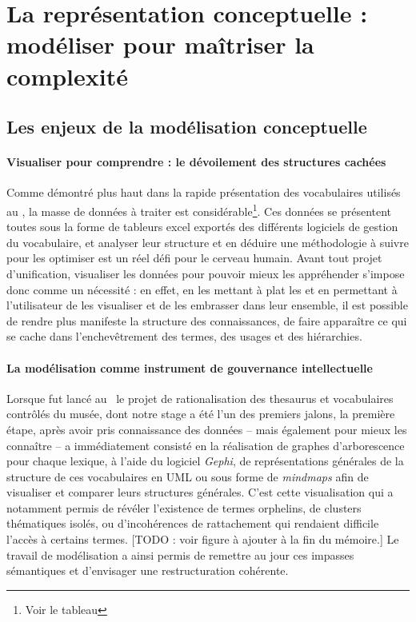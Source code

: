\section[La modélisation]{\label{III-A-1}La représentation conceptuelle : modéliser pour maîtriser la complexité}

\subsection{Les enjeux de la modélisation conceptuelle}

\paragraph*{Visualiser pour comprendre : le dévoilement des structures cachées}
Comme démontré plus haut dans la rapide présentation des vocabulaires utilisés au \mae, la masse de données à traiter est considérable\footnote{Voir le tableau }. Ces données se présentent toutes sous la forme de tableurs excel exportés des différents logiciels de gestion du vocabulaire, et analyser leur structure et en déduire une méthodologie à suivre pour les optimiser est un réel défi pour le cerveau humain. Avant tout projet d'unification, visualiser les données pour pouvoir mieux les appréhender s’impose donc comme un nécessité : en effet, en les mettant à plat les et en permettant à l'utilisateur de les visualiser et de les embrasser dans leur ensemble, il est possible de rendre plus manifeste la structure des connaissances, de faire apparaître ce qui se cache dans l’enchevêtrement des termes, des usages et des hiérarchies.

\paragraph*{La modélisation comme instrument de gouvernance intellectuelle}
Lorsque fut lancé au \mae~le projet de rationalisation des \gls{thesaurus} et vocabulaires contrôlés du musée, dont notre stage a été l'un des premiers jalons, la première étape, après avoir pris connaissance des données -- mais également pour mieux les connaître -- a immédiatement consisté en la réalisation de graphes d’arborescence pour chaque lexique, à l’aide du logiciel \textit{Gephi}, de représentations générales de la structure de ces vocabulaires en UML ou sous forme de \textit{mindmaps} afin de visualiser et comparer leurs structures générales. C'est cette visualisation qui a notamment permis de révéler l’existence de termes orphelins, de clusters thématiques isolés, ou d’incohérences de rattachement qui rendaient difficile l'accès à certains termes. [TODO : voir figure à ajouter à la fin du mémoire.] Le travail de modélisation a ainsi permis de remettre au jour ces impasses sémantiques et d’envisager une restructuration cohérente.

